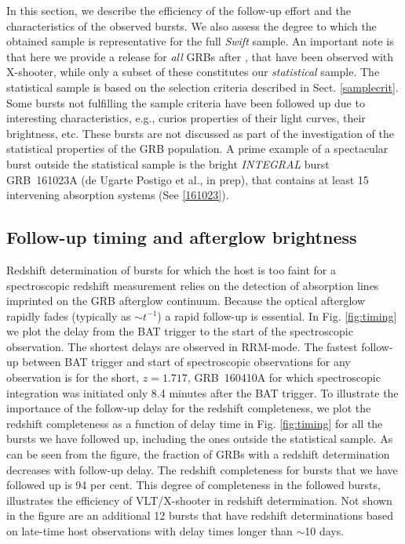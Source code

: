 \documentclass[longauth]{aa}    %
\begin{document}
In this section, we describe the efficiency of the follow-up effort and the
characteristics of the observed bursts. We also assess the degree to which the
obtained sample is representative for the full \textit{Swift} sample. An
important note is that here we provide a release for \textit{all} GRBs after
\startdate, that have been observed with X-shooter, while only a subset of these
constitutes our \textit{statistical} sample. The statistical sample is based on
the selection criteria described in Sect. \ref{samplecrit}. Some bursts not
fulfilling the sample criteria have been followed up due to interesting
characteristics, e.g., curios properties of their light curves, their
brightness, etc. These bursts are not discussed as part of the investigation of
the statistical properties of the GRB population. A prime example of a
spectacular burst outside the statistical sample is the bright \textit{INTEGRAL}
burst GRB~161023A (de Ugarte Postigo et al., in prep), that contains at least 15
intervening absorption systems (See \ref{161023}).

\subsection{Follow-up timing and afterglow brightness} \label{timing}

Redshift determination of bursts for which the host is too faint for a
spectroscopic redshift measurement relies on the detection of absorption lines
imprinted on the GRB afterglow continuum. Because the optical afterglow rapidly
fades (typically as $\sim t^{-1}$) a rapid follow-up is essential. In Fig.
\ref{fig:timing} we plot the delay from the BAT trigger to the start of the
spectroscopic observation. The shortest delays are observed in RRM-mode. The
fastest follow-up between BAT trigger and start of spectroscopic observations
for any observation is for the short, $z = 1.717$, GRB~160410A for which
spectroscopic integration was initiated only 8.4 minutes after the BAT trigger.
To illustrate the importance of the follow-up delay for the redshift
completeness, we plot the redshift completeness as a function of delay time in
Fig. \ref{fig:timing} for all the bursts we have followed up, including the ones
outside the statistical sample. As can be seen from the figure, the fraction of
GRBs with a redshift determination decreases with follow-up delay. The redshift
completeness for bursts that we have followed up is 94 per cent. This degree of
completeness in the followed bursts, illustrates the efficiency of VLT/X-shooter
in redshift determination. Not shown in the figure are an additional 12 bursts
that have redshift determinations based on late-time host observations with
delay times longer than $\sim$10 days.
\end{document}
